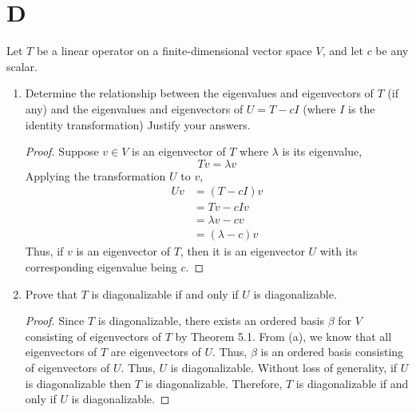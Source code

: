 \documentclass[11pt]{scrartcl}
\begin{document}
\section{D}
Let $T$ be a linear operator on a finite-dimensional vector space $V$, and let $c$ be any scalar.
\begin{enumerate}[label=\alph*.]
	\item{
	      Determine the relationship between the eigenvalues and eigenvectors of $T$ (if any) and the eigenvalues and
	      eigenvectors of $U = T - cI$ (where $I$ is the identity transformation) Justify your answers.
	      \begin{proof}
		      Suppose $v \in V$ is an eigenvector of $T$ where $\lambda$ is its eigenvalue,
		      $$Tv = \lambda v$$
		      Applying the transformation $U$ to $v$,
		      \begin{align*}
			      Uv & = (T - cI)v      \\
			         & = Tv - cIv       \\
			         & = \lambda v - cv \\
			         & = (\lambda - c)v
		      \end{align*}
		      Thus, if $v$ is an eigenvector of $T$, then it is an eigenvector $U$ with its corresponding
		      eigenvalue being $c$.
	      \end{proof}
	      }
	\item{
	      Prove that $T$ is diagonalizable if and only if $U$ is diagonalizable.
	      \begin{proof}
		      Since $T$ is diagonalizable, there exists an ordered basis $\beta$ for $V$
		      consisting of eigenvectors of $T$ by Theorem 5.1.
		      From (a), we know that all eigenvectors of $T$ are eigenvectors of $U$.
		      Thus, $\beta$ is an ordered basis consisting of eigenvectors of $U$.
		      Thus, $U$ is diagonalizable. Without loss of generality, if $U$ is diagonalizable
		      then $T$ is diagonalizable. Therefore, $T$ is diagonalizable if and only if $U$ is diagonalizable.

	      \end{proof}
	      }
\end{enumerate}

\end{document}

